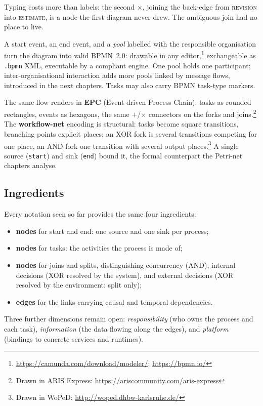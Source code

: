 Typing costs more than labels: the second $\times$, joining the back-edge from \textsc{revision} into \textsc{estimate}, is a node the first diagram never drew. The ambiguous join had no place to live.

A start event, an end event, and a \emph{pool} labelled with the responsible organisation turn the diagram into valid BPMN~2.0: drawable in any editor,\footnote{\url{https://camunda.com/download/modeler/}; \url{https://bpmn.io/}} exchangeable as \texttt{.bpmn} XML, executable by a compliant engine. One pool holds one participant; inter-organisational interaction adds more pools linked by message flows, introduced in the next chapters. Tasks may also carry BPMN task-type markers.

The same flow renders in \textbf{EPC} (Event-driven Process Chain): tasks as rounded rectangles, events as hexagons, the same $+$/$\times$ connectors on the forks and joins.\footnote{Drawn in ARIS Express: \url{https://ariscommunity.com/aris-express}} The \textbf{workflow-net} encoding is structural: tasks become square transitions, branching points explicit places; an XOR fork is several transitions competing for one place, an AND fork one transition with several output places.\footnote{Drawn in WoPeD: \url{http://woped.dhbw-karlsruhe.de/}} A single source (\texttt{start}) and sink (\texttt{end}) bound it, the formal counterpart the Petri-net chapters analyse.

\subsection{Ingredients}

Every notation seen so far provides the same four ingredients:

\begin{itemize}
  \item \textbf{nodes} for start and end: one source and one sink per process;
  \item \textbf{nodes} for tasks: the activities the process is made of;
  \item \textbf{nodes} for joins and splits, distinguishing concurrency (AND), internal decisions (XOR resolved by the system), and external decisions (XOR resolved by the environment: split only);
  \item \textbf{edges} for the links carrying causal and temporal dependencies.
\end{itemize}

Three further dimensions remain open: \emph{responsibility} (who owns the process and each task), \emph{information} (the data flowing along the edges), and \emph{platform} (bindings to concrete services and runtimes).

